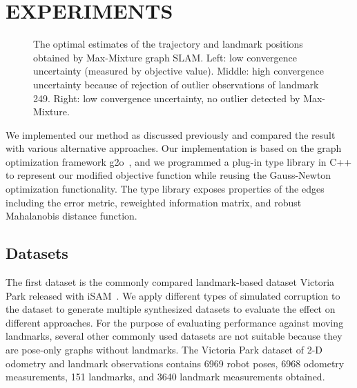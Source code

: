 \section{EXPERIMENTS}

\begin{figure}[!ht]
\caption{The optimal estimates of the trajectory and landmark positions
obtained by Max-Mixture graph SLAM.  Left: low convergence uncertainty
(measured by objective value). Middle: high convergence uncertainty because of
rejection of outlier observations of landmark 249.  Right: low convergence
uncertainty, no outlier detected by Max-Mixture.}
\label{fig:baseline}
\end{figure}

We implemented our method as discussed previously and compared the result with
various alternative approaches. Our implementation is based on the graph
optimization framework g2o~\cite{g2o}, and we programmed a plug-in type library
in C++ to represent our modified objective function while reusing the Gauss-Newton
optimization functionality. The type library exposes properties of the edges including
the error metric, reweighted information matrix, and robust Mahalanobis distance function.

\subsection{Datasets}

The first dataset is the commonly compared landmark-based dataset Victoria Park released with iSAM~\cite{isam}. We apply different types of simulated corruption to the dataset to
generate multiple synthesized datasets to evaluate the effect on different
approaches.  For the purpose of evaluating performance against moving
landmarks, several other commonly used datasets are not suitable because they
are pose-only graphs without landmarks. The Victoria Park dataset of 2-D
odometry and landmark observations contains 6969 robot poses, 6968 odometry
measurements, 151 landmarks, and 3640 landmark measurements obtained.

